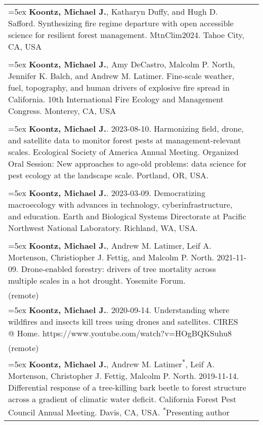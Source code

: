 \begin{longtable}{@{}>{\raggedright}p{5.25in} @{} >{\raggedleft}X@{}}

\hangindent=5ex \textbf{Koontz, Michael J.}, Katharyn Duffy, and Hugh D. Safford. Synthesizing fire regime departure with open accessible science for resilient forest management. MtnClim2024. Tahoe City, CA, USA & 2024 \\ \tabularnewline

\hangindent=5ex \textbf{Koontz, Michael J.}, Amy DeCastro, Malcolm P. North, Jennifer K. Balch, and Andrew M. Latimer. Fine-scale weather, fuel, topography, and human drivers of explosive fire spread in California. 10th International Fire Ecology and Management Congress. Monterey, CA, USA & 2023 \\ \tabularnewline

\hangindent=5ex \textbf{Koontz, Michael J.}. 2023-08-10. Harmonizing field, drone, and satellite data to monitor forest pests at management-relevant scales. Ecological Society of America Annual Meeting. Organized Oral Session: New approaches to age-old problems: data science for pest ecology at the landscape scale. Portland, OR, USA. & 2023 \\  \tabularnewline

\hangindent=5ex \textbf{Koontz, Michael J.}. 2023-03-09. Democratizing macroecology with advances in technology, cyberinfrastructure, and education. Earth and Biological Systems Directorate at Pacific Northwest National Laboratory. Richland, WA, USA. & 2023 \\  \tabularnewline

\hangindent=5ex \textbf{Koontz, Michael J.}, Andrew M. Latimer, Leif A. Mortenson, Christiopher J. Fettig, and Malcolm P. North. 2021-11-09. Drone-enabled forestry: drivers of tree mortality across multiple scales in a hot drought. Yosemite Forum. & 2021 \\ (remote) \tabularnewline

\hangindent=5ex \textbf{Koontz, Michael J.}. 2020-09-14. Understanding where wildfires and insects kill trees using drones and satellites. CIRES @ Home. https://www.youtube.com/watch?v=HOgBQKSuhu8 & 2020 \\ (remote) \tabularnewline

\hangindent=5ex \textbf{Koontz, Michael J.}, Andrew M. Latimer\textsuperscript{*}, Leif A. Mortenson, Christopher J. Fettig, Malcolm P. North. 2019-11-14. Differential response of a tree-killing bark beetle to forest structure across a gradient of climatic water deficit. California Forest Pest Council Annual Meeting. Davis, CA, USA. \newline \textsuperscript{*}Presenting author & 2019 \tabularnewline


\end{longtable}

